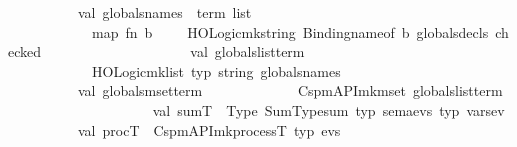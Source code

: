 \begin{isabellebody}
\ \ \ \ \ \ \ \ {\isacharparenleft}{\kern0pt}{\isacharasterisk}{\kern0pt}\ \ val\ globals{\isacharunderscore}{\kern0pt}names\ {\isacharcolon}{\kern0pt}\ term\ list\ {\isacharequal}{\kern0pt}\isanewline
\ \ \ \ \ \ \ \ \ \ \ \ map\ {\isacharparenleft}{\kern0pt}fn\ {\isacharparenleft}{\kern0pt}b{\isacharcomma}{\kern0pt}\ {\isacharunderscore}{\kern0pt}{\isacharcomma}{\kern0pt}\ {\isacharunderscore}{\kern0pt}{\isacharcomma}{\kern0pt}\ {\isacharunderscore}{\kern0pt}{\isacharparenright}{\kern0pt}\ {\isacharequal}{\kern0pt}{\isachargreater}{\kern0pt}\ HOLogic{\isachardot}{\kern0pt}mk{\isacharunderscore}{\kern0pt}string\ {\isacharparenleft}{\kern0pt}Binding{\isachardot}{\kern0pt}name{\isacharunderscore}{\kern0pt}of\ b{\isacharparenright}{\kern0pt}{\isacharparenright}{\kern0pt}\ {\isacharparenleft}{\kern0pt}{\isacharhash}{\kern0pt}globals{\isacharunderscore}{\kern0pt}decls\ checked{\isacharparenright}{\kern0pt}\isanewline
\ \ \ \ \ \ \ \ \ \ \isanewline
\ \ \ \ \ \ \ \ \ \ val\ globals{\isacharunderscore}{\kern0pt}list{\isacharunderscore}{\kern0pt}term\ {\isacharequal}{\kern0pt}\isanewline
\ \ \ \ \ \ \ \ \ \ \ \ HOLogic{\isachardot}{\kern0pt}mk{\isacharunderscore}{\kern0pt}list\ {\isacharat}{\kern0pt}{\isacharbraceleft}{\kern0pt}typ\ string{\isacharbraceright}{\kern0pt}\ globals{\isacharunderscore}{\kern0pt}names\isanewline
\ \ \ \ \ \ \ \ \ \ \isanewline
\ \ \ \ \ \ \ \ \ \ val\ globals{\isacharunderscore}{\kern0pt}mset{\isacharunderscore}{\kern0pt}term\ {\isacharequal}{\kern0pt}\isanewline
\ \ \ \ \ \ \ \ \ \ \ \ Cspm{\isacharunderscore}{\kern0pt}API{\isachardot}{\kern0pt}mk{\isacharunderscore}{\kern0pt}mset\ globals{\isacharunderscore}{\kern0pt}list{\isacharunderscore}{\kern0pt}term\isanewline
\ \ \ \ \ \ \ \ \ \ \isanewline
\ \ \ \ \ \ \ \ \ \ {\isacharparenleft}{\kern0pt}{\isacharasterisk}{\kern0pt}val\ sumT\ {\isacharequal}{\kern0pt}\ Type\ {\isacharparenleft}{\kern0pt}{\isachardoublequote}{\kern0pt}Sum{\isacharunderscore}{\kern0pt}Type{\isachardot}{\kern0pt}sum{\isachardoublequote}{\kern0pt}{\isacharcomma}{\kern0pt}\ {\isacharbrackleft}{\kern0pt}{\isacharat}{\kern0pt}{\isacharbraceleft}{\kern0pt}typ\ sema{\isacharunderscore}{\kern0pt}evs{\isacharbraceright}{\kern0pt}{\isacharcomma}{\kern0pt}\ {\isacharat}{\kern0pt}{\isacharbraceleft}{\kern0pt}typ\ vars{\isacharunderscore}{\kern0pt}ev{\isacharbraceright}{\kern0pt}{\isacharbrackright}{\kern0pt}{\isacharparenright}{\kern0pt}{\isacharasterisk}{\kern0pt}{\isacharparenright}{\kern0pt}\isanewline
\ \ \ \ \ \ \ \ \ \ val\ procT\ {\isacharequal}{\kern0pt}\ Cspm{\isacharunderscore}{\kern0pt}API{\isachardot}{\kern0pt}mk{\isacharunderscore}{\kern0pt}processT\ {\isacharat}{\kern0pt}{\isacharbraceleft}{\kern0pt}typ\ evs{\isacharbraceright}{\kern0pt}\isanewline

\end{isabellebody}
